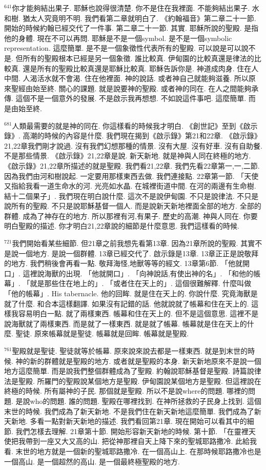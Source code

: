 \documentclass{book}
\begin{document}
$^{641}$你才能夠結出果子.
耶穌也說得很清楚.
你不是住在我裡面.
不能夠結出果子.
水和樹.
猶太人究竟明不明.
我們看第二章就明白了.
《約翰福音》第二章二十一節.
開始的時候約翰已經交代了一件事.
第二章二十一節.
其實.
耶穌所說的聖殿.
是指他的身體.
現在不可以再問.
耶穌是不是一個symbol.
是不是一個symbolic representation.
這麼簡單.
是不是一個象徵性代表所有的聖殿.
可以說是可以說不是.
但所有的聖殿根本已經是另一個象徵.
誰比較真.
伊甸園的比較真還是律法的比較真.
還是所有的聖殿比較真還是耶穌比較真.
耶穌告訴你是.
神道成肉身.
住在人中間.
人渴活水就不會渴.
住在他裡面.
神的說話.
或者神自己就能夠滋養.
所以原來聖經由始至終.
關心的課題.
就是說要神的聖殿.
或者神的同在.
在人之間能夠承傳.
這個不是一個意外的發展.
不是啟示我再想想.
不如說這件事吧.
這麼簡單.
而是由始至終.

$^{681}$人類最需要的就是神的同在.
你這樣看的時候我才明白.
《創世記》至到《啟示錄》.
高潮的時候的內容是什麼.
我們現在揭到《啟示錄》第21和22章.
《啟示錄》21,22章我們剛才說過.
沒有我們幻想那種的情景.
沒有大屋.
沒有好車.
沒有自助餐.
不是那些情景.
《啟示錄》21,22章是說.
新天新地.
就是神與人同在終極的地方.
《啟示錄》21,22章所描述的就是聖殿.
我們看21,22章.
我們先看22章第一,一,二節.
因為我們由河和樹說起.
一定要用那樣東西去做.
我們連接點.
22章第一節.
「天使又指給我看一道生命水的河.
光亮如水晶.
在城裡街道中間.
在河的兩邊有生命樹.
結十二個果子」.
我們現在明白說什麼.
這次不是說伊甸園.
不只是說律法.
不只是說所有的聖殿.
不只是說耶穌基督一個人.
而是說新天新地裡面全部的地方.
全部的群體.
成為了神存在的地方.
所以那裡有河,有果子.
歷史的高潮.
神與人同在.
你要明白聖殿的描述.
你才明白21,22章說的細節是什麼意思.
我們這樣看的時候.

$^{721}$我們開始看某些細節.
但21章之前我想先看第13章.
因為21章所說的聖殿.
其實不是說一個地方.
是說一個群體.
13章已經交代了.
啟示錄是13章.
13章正正是說敬拜的地方.
我們稍後會再看一點.
敬拜海怪,地獸等等的經文.
13章第6節.
「他就開口」.
這裡說海獸的出現.
「他就開口」.
「向神說話,有使出神的名」.
「和他的帳幕」.
「就是那些住在地上的」.
「或者住在天上的」.
這個很難解釋.
什麼叫做「他的帳幕」.
His tabernacle.
他的回眸.
就是住在天上的.
你說什麼.
究竟海獸是就了什麼.
和合本這樣翻譯.
如果沒有記錯的話.
他就說就了帳幕和住在天上的.
這樣我容易明白一點.
就了兩樣東西.
帳幕和住在天上的.
但不是這個意思.
這裡不是說海獸就了兩樣東西.
而是就了一樣東西.
就是就了帳幕.
帳幕就是住在天上的什麼.
聖徒.
原來帳幕就是聖徒.
帳幕就是回眸.
帳幕就是聖殿.

$^{761}$聖殿就是聖徒.
聖徒就等於帳幕.
原來說來說去都是一樣東西.
就是到末世的時候.
神的新的群體就是聖殿的地方.
或者就是聖殿的本身.
新天新地原來不是說一個地方這麼簡單.
而是說我們整個群體成為了聖殿.
約翰說耶穌基督是聖殿.
詩篇說律法是聖殿.
所羅門的聖殿說某個地方是聖殿.
伊甸園說某個地方是聖殿.
但這裡說在終極的時候.
所有屬神的子民.
那個就是聖殿.
所以不是說where的問題.
哪裡的問題.
是說who的問題.
誰的問題.
聖殿在哪裡找到.
在神所拯救的子民身上找到.
這個末世的時候.
我們成為了新天新地.
不是我們住在新天新地這麼簡單.
我們成為了新天新地.
多看一點對新天新地的描述.
我們看回第21章.
現在開始可以看其中的細節.
我們怎樣去理解.
21章第十節.
開始形容新天新地的時候.
第十節.
「在靈裡天使把我帶到一座又大又高的山.
把從神那裡自天上降下來的聖城耶路撒冷.
此給我看.
末世的地方就是一個新的聖城耶路撒冷.
在一個高山上.
在那時候耶路撒冷也是一個高山.
是一個超然的高山.
是一個最終極聖殿的地方.
\end{document}
